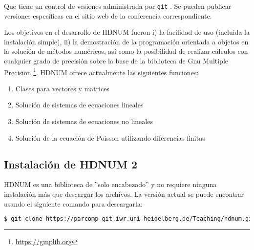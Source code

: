 Que tiene un control de vesiones administrada por \lstinline{git} .
Se pueden publicar versiones específicas en el sitio web de la conferencia correspondiente.

Los objetivos en el desarrollo de HDNUM fueron i) la facilidad de uso (incluida la instalación simple), ii) la demostración de la programación orientada a objetos en la solución de métodos numéricos, así como la posibilidad de realizar cálculos con cualquier grado de precisión sobre la base de la biblioteca de Gnu Multiple Precision \footnote{\url{https://gmplib.org}}. HDNUM ofrece actualmente las siguientes funciones:
\begin{enumerate}[1)]
\item Clases para vectores y matrices
\item Solución de sistemas de ecuaciones lineales
\item Solución de sistemas de ecuaciones no lineales
\item Solución de la ecuación de Poisson utilizando diferencias finitas
\end{enumerate}

\subsection{Instalación de HDNUM 2}

HDNUM es una biblioteca de ''solo encabezado'' y no requiere ninguna instalación más que descargar los archivos. La versión actual se puede encontrar usando el siguiente comando para descargarla:

\begin{lstlisting}[basicstyle=\ttfamily\footnotesize,language=bash,frame=single]
$ git clone https://parcomp-git.iwr.uni-heidelberg.de/Teaching/hdnum.git
\end{lstlisting}

